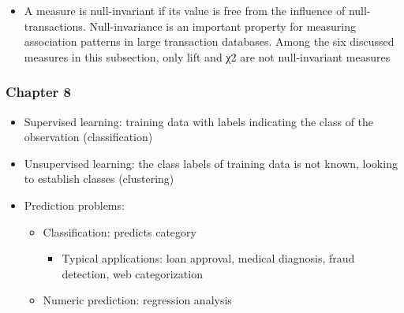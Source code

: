 \documentclass[11pt]{article}
\providecommand{\tightlist}{%
      \setlength{\itemsep}{0pt}\setlength{\parskip}{0pt}}
\begin{document}
    \begin{itemize}
\tightlist
\item
  A measure is null-invariant if its value is free from the influence of
  null-transactions. Null-invariance is an important property for
  measuring association patterns in large transaction databases. Among
  the six discussed measures in this subsection, only lift and χ2 are
  not null-invariant measures
\end{itemize}

    \subsubsection{Chapter 8}\label{chapter-8}

    \begin{itemize}
\tightlist
\item
  Supervised learning: training data with labels indicating the class of
  the observation (classification)
\item
  Unsupervised learning: the class labels of training data is not known,
  looking to establish classes (clustering)
\end{itemize}

    \begin{itemize}
\tightlist
\item
  Prediction problems:

  \begin{itemize}
  \tightlist
  \item
    Classification: predicts category

    \begin{itemize}
    \tightlist
    \item
      Typical applications: loan approval, medical diagnosis, fraud
      detection, web categorization
    \end{itemize}
  \item
    Numeric prediction: regression analysis
  \end{itemize}
\end{itemize}
\end{document}
